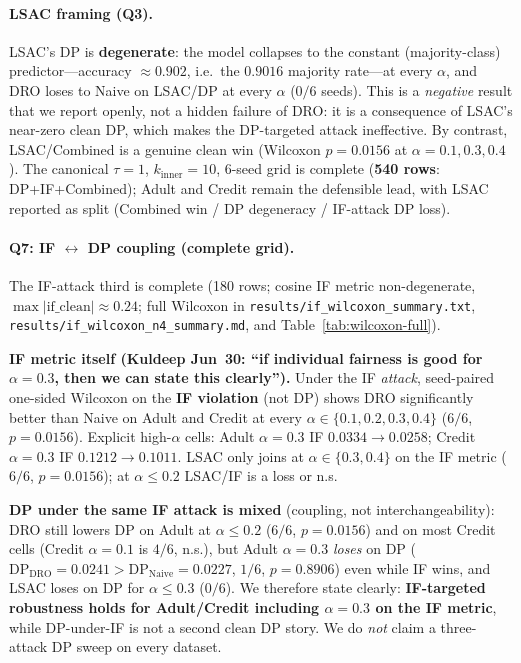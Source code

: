\paragraph{LSAC framing (Q3).}
\label{sec:lsac-framing}
LSAC's DP is \textbf{degenerate}: the model collapses to the
constant (majority-class) predictor---accuracy $\approx0.902$, i.e.\
the $0.9016$ majority rate---at every $\alpha$, and DRO loses to Naive
on LSAC/DP at every $\alpha$ ($0/6$ seeds).  This is a \emph{negative}
result that we report openly, not a hidden failure of DRO: it is a
consequence of LSAC's near-zero clean DP, which makes the DP-targeted
attack ineffective.  By contrast, LSAC/Combined is a genuine clean win
(Wilcoxon $p{=}0.0156$ at $\alpha{=}0.1,0.3,0.4$).  The canonical
$\tau{=}1$, $k_{\mathrm{inner}}{=}10$, 6-seed grid is complete
(\textbf{540 rows}: DP+IF+Combined); Adult and Credit remain the
defensible lead, with LSAC reported as split (Combined win / DP
degeneracy / IF-attack DP loss).

\paragraph{Q7: IF $\leftrightarrow$ DP coupling (complete grid).}
The IF-attack third is complete (180 rows; cosine IF metric
non-degenerate, $\max|\mathrm{if\_clean}|\!\approx\!0.24$; full
Wilcoxon in \texttt{results/if\_wilcoxon\_summary.txt},
\texttt{results/if\_wilcoxon\_n4\_summary.md}, and
Table~\ref{tab:wilcoxon-full}).

\textbf{IF metric itself (Kuldeep Jun~30: ``if individual fairness is good
for $\alpha{=}0.3$, then we can state this clearly'').}
Under the IF \emph{attack}, seed-paired one-sided Wilcoxon on the
\textbf{IF violation} (not DP) shows DRO significantly better than Naive on
Adult and Credit at every $\alpha\in\{0.1,0.2,0.3,0.4\}$ ($6/6$,
$p{=}0.0156$).  Explicit high-$\alpha$ cells: Adult $\alpha{=}0.3$ IF
$0.0334\!\to\!0.0258$; Credit $\alpha{=}0.3$ IF $0.1212\!\to\!0.1011$.
LSAC only joins at $\alpha\in\{0.3,0.4\}$ on the IF metric
($6/6$, $p{=}0.0156$); at $\alpha\le0.2$ LSAC/IF is a loss or n.s.

\textbf{DP under the same IF attack is mixed} (coupling, not interchangeability):
DRO still lowers DP on Adult at $\alpha\le0.2$ ($6/6$, $p{=}0.0156$) and on
most Credit cells (Credit $\alpha{=}0.1$ is $4/6$, n.s.), but Adult
$\alpha{=}0.3$ \emph{loses} on DP ($\mathrm{DP}_{\mathrm{DRO}}{=}0.0241 >
\mathrm{DP}_{\mathrm{Naive}}{=}0.0227$, $1/6$, $p{=}0.8906$) even while IF
wins, and LSAC loses on DP for $\alpha\le0.3$ ($0/6$).  We therefore state clearly:
\textbf{IF-targeted robustness holds for Adult/Credit including $\alpha{=}0.3$
on the IF metric}, while DP-under-IF is not a second clean DP story.  We do
\emph{not} claim a three-attack DP sweep on every dataset.

